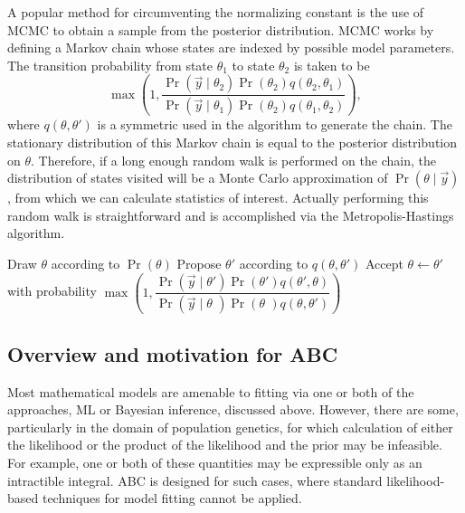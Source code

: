 A popular method for circumventing the normalizing constant is the use of
\gls{MCMC} to obtain a sample from the posterior distribution. \Gls{MCMC} works
by defining a Markov chain whose states are indexed by possible model
parameters. The transition probability from state $\theta_1$ to state
$\theta_2$ is taken to be
\[
  \max\left(1, \frac{\Pr(\vec{y} \mid \theta_2) \Pr(\theta_2) q(\theta_2, \theta_1)}
                    {\Pr(\vec{y} \mid \theta_1) \Pr(\theta_2) q(\theta_1, \theta_2)} \right),
\]
where $q(\theta, \theta')$ is a symmetric  used in
the algorithm to generate the chain. The stationary distribution of this Markov
chain is equal to the posterior distribution on $\theta$. Therefore, if a long
enough random walk is performed on the chain, the distribution of states
visited will be a Monte Carlo approximation of $\Pr(\theta \mid \vec{y})$, from
which we can calculate statistics of interest. Actually performing this random
walk is straightforward and is accomplished via the Metropolis-Hastings
algorithm.

\begin{algorithm}
  \begin{algorithmic}
    \State Draw $\theta$ according to $\Pr(\theta)$
    \Loop
      \State Propose $\theta'$ according to $q(\theta, \theta')$
      \State Accept $\theta \gets \theta'$ with probability
      $\max \left( 1, 
       \dfrac{\Pr(\vec{y} \mid \theta') \Pr(\theta') q(\theta', \theta)}
             {\Pr(\vec{y} \mid \theta\phantom{'}) \Pr(\theta\phantom{'}) q(\theta, \theta')}
       \right)$
    \EndLoop
  \end{algorithmic}
  \label{alg:mh}
\end{algorithm}

\subsection{Overview and motivation for ABC}

Most mathematical models are amenable to fitting via one or both of the
approaches, \gls{ML} or Bayesian inference, discussed above. However, there are
some, particularly in the domain of population genetics, for which calculation
of either the likelihood or the product of the likelihood and the prior may be
infeasible. For example, one or both of these quantities may be expressible
only as an intractible integral. \Gls{ABC} is designed for such cases, where
standard likelihood-based techniques for model fitting cannot be applied.

